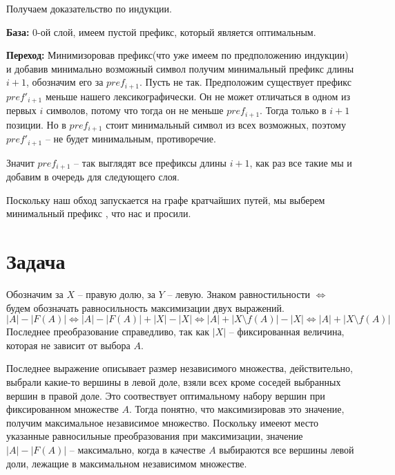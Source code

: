 \documentclass{article}
\begin{document}
\begin{itemize}
        Получаем доказательство по индукции.
        
        \textbf{База:} $0$-ой слой, имеем пустой префикс, который является оптимальным.
        
        \textbf{Переход:} Минимизоровав префикс(что уже имеем по предположению индукции) и добавив минимально возможный символ получим минимальный префикс длины $i + 1$, обозначим его за $pref_{i + 1}$. Пусть не так. Предположим существует префикс $pref'_{i + 1}$ меньше нашего лексикографически. Он не может отличаться в одном из первых $i$ символов, потому что тогда он не меньше $pref_{i + 1}$. Тогда только в $i + 1$ позиции. Но в $pref_{i + 1}$ стоит минимальный символ из всех возможных, поэтому $pref'_{i + 1}$ -- не будет минимальным, противоречие.
        
        Значит $pref_{i + 1}$ -- так выглядят все префиксы длины $i + 1$, как раз все такие мы и добавим в очередь для следующего слоя. 
        
        Поскольку наш обход запускается на графе кратчайших путей, мы выберем минимальный префикс , что нас и просили.
            
    \end{itemize}
\section*{Задача }
    Обозначим за $X$ -- правую долю, за $Y$ -- левую. Знаком равностильности $\Leftrightarrow$ будем обозначать равносильность максимизации двух выражений.
    $$ |A| - |F(A)| \Leftrightarrow |A| - |F(A)| + |X| - |X| \Leftrightarrow |A| + |X \setminus f(A)| - |X| \Leftrightarrow |A| + |X \setminus f(A)| $$
    Последнее преобразование справедливо, так как $|X|$ -- фиксированная величина, которая не зависит от выбора $A$.
    
    Последнее выражение описывает размер независимого множества, действительно, выбрали какие-то вершины в левой доле, взяли всех кроме соседей выбранных вершин в правой доле. Это соотвествует оптимальному набору вершин при фиксированном множестве $A$. Тогда понятно, что максимизировав это значение, получим максимальное независимое множество. Поскольку имееют место указанные равносильные преобразования при максимизации, значение $|A| - |F(A)|$  -- максимально, когда в качестве $A$ выбираются все вершины левой доли, лежащие в максимальном независимом множестве.
\end{document}
